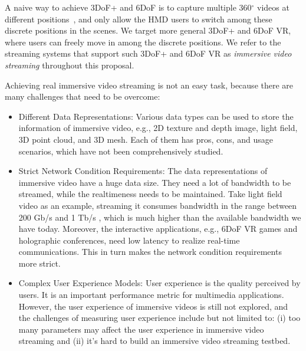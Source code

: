 A naive way to achieve 3DoF+ and 6DoF is to capture multiple 360$^{\circ}$ videos at different positions~\cite{CSSF18,PZWL+19}, 
and only allow the HMD users to 
switch among these discrete positions in the scenes.
We target more general 3DoF+ and 6DoF VR, where users can freely move in among the discrete positions.
We refer to the streaming systems that support such 3DoF+ and 6DoF VR as {\em immersive video streaming} throughout this proposal.

Achieving real immersive video streaming is not an easy task, because there are many challenges that need to be overcome:
\begin{itemize}
	\item {Different Data Representations: } Various data types can be used to store the information of immersive video, e.g.,
	2D texture and depth image, light field, 3D point cloud, and 3D mesh. Each of them has pros, cons, and usage scenarios, which have not been comprehensively studied.
	\item {Strict Network Condition Requirements: } The data representations of immersive video have a huge data size. 
	They need a lot of bandwidth to be streamed, while the realtimeness needs to be maintained. 
	Take light field video as an example, streaming it consumes bandwidth in the range between 
	200 Gb/s and 1 Tb/s \cite{CVRW+20}, which is much higher than the available bandwidth we have today.
	Moreover, the interactive applications, e.g., 6DoF VR games and holographic conferences, need low latency to realize real-time communications.
	This in turn makes the network condition requirements more strict.
	\item {Complex User Experience Models: } User experience is the quality perceived by  users. 
	It is an important performance metric for multimedia applications.
	However, the user experience of immersive videos is still not explored,
	and the challenges of measuring user experience include but not limited to: 
	(i) too many parameters may affect the user experience in immersive video streaming
	and (ii) it's hard to build an immersive video streaming testbed.
	
\end{itemize}


